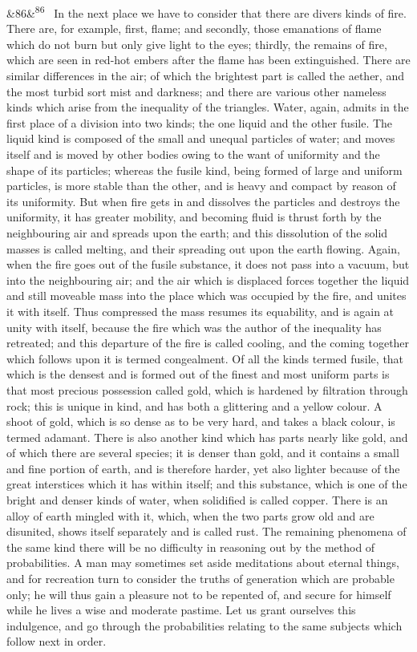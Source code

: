\documentclass[12pt]{article}
\newcommand{\para}[1][]{\par\noindent\ifx&#1&\else\textsuperscript{\footnotesize #1}~\fi}
\begin{document}
\para[86] In the next place we have to consider that there are divers kinds of fire. There are, for example, first, flame; and secondly, those emanations of flame which do not burn but only give light to the eyes; thirdly, the remains of fire, which are seen in red-hot embers after the flame has been extinguished. There are similar differences in the air; of which the brightest part is called the aether, and the most turbid sort mist and darkness; and there are various other nameless kinds which arise from the inequality of the triangles. Water, again, admits in the first place of a division into two kinds; the one liquid and the other fusile. The liquid kind is composed of the small and unequal particles of water; and moves itself and is moved by other bodies owing to the want of uniformity and the shape of its particles; whereas the fusile kind, being formed of large and uniform particles, is more stable than the other, and is heavy and compact by reason of its uniformity. But when fire gets in and dissolves the particles and destroys the uniformity, it has greater mobility, and becoming fluid is thrust forth by the neighbouring air and spreads upon the earth; and this dissolution of the solid masses is called melting, and their spreading out upon the earth flowing. Again, when the fire goes out of the fusile substance, it does not pass into a vacuum, but into the neighbouring air; and the air which is displaced forces together the liquid and still moveable mass into the place which was occupied by the fire, and unites it with itself. Thus compressed the mass resumes its equability, and is again at unity with itself, because the fire which was the author of the inequality has retreated; and this departure of the fire is called cooling, and the coming together which follows upon it is termed congealment. Of all the kinds termed fusile, that which is the densest and is formed out of the finest and most uniform parts is that most precious possession called gold, which is hardened by filtration through rock; this is unique in kind, and has both a glittering and a yellow colour. A shoot of gold, which is so dense as to be very hard, and takes a black colour, is termed adamant. There is also another kind which has parts nearly like gold, and of which there are several species; it is denser than gold, and it contains a small and fine portion of earth, and is therefore harder, yet also lighter because of the great interstices which it has within itself; and this substance, which is one of the bright and denser kinds of water, when solidified is called copper. There is an alloy of earth mingled with it, which, when the two parts grow old and are disunited, shows itself separately and is called rust. The remaining phenomena of the same kind there will be no difficulty in reasoning out by the method of probabilities. A man may sometimes set aside meditations about eternal things, and for recreation turn to consider the truths of generation which are probable only; he will thus gain a pleasure not to be repented of, and secure for himself while he lives a wise and moderate pastime. Let us grant ourselves this indulgence, and go through the probabilities relating to the same subjects which follow next in order.
\end{document}
